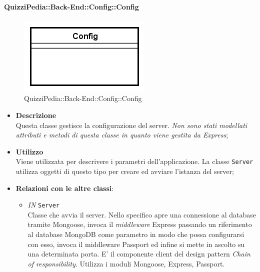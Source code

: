 \paragraph{QuizziPedia::Back-End::Config::Config}
\label{QuizziPedia::Back-End::Config::Config}
\begin{figure}[ht]
	\centering
	\includegraphics[scale=0.45]{UML/Classi/Back-End/QuizziPedia_Back-End_Config_Config.png}
	\caption{QuizziPedia::Back-End::Config::Config}
	\end{figure}
\FloatBarrier
	\begin{itemize}
		\item \textbf{Descrizione} \\
		Questa classe gestisce la configurazione del server. \textit{Non sono stati modellati attributi e metodi di questa classe in quanto viene gestita da Express};
		\item \textbf{Utilizzo} \\
		Viene utilizzata per descrivere i parametri dell'applicazione. La classe \texttt{Server} utilizza oggetti di questo tipo per creare ed avviare l'istanza del server;
		\item \textbf{Relazioni con le altre classi}:
		 \begin{itemize}
		 	\item \textit{IN} \texttt{Server} \\
		 	Classe che avvia il server. Nello specifico apre una connessione al database tramite Mongoose, invoca il \textit{middleware} Express passando un riferimento al database MongoDB come parametro in modo  che possa configurarsi con esso, invoca il middleware Passport ed infine si mette in ascolto su una determinata porta. E' il componente client del design pattern \textit{Chain of responsibility}. Utilizza i moduli Mongoose, Express, Passport.
		 \end{itemize}
	\end{itemize}
